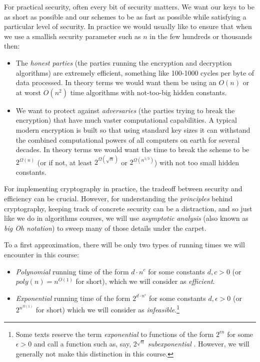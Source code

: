 For practical security, often every bit of security matters. We want our
keys to be as short as possible and our schemes to be as fast as
possible while satisfying a particular level of security. In practice we
would usually like to ensure that when we use a smallish security
parameter such as \(n\) in the few hundreds or thousands then:

\begin{itemize}
\item
  The \emph{honest parties} (the parties running the encryption and
  decryption algorithms) are extremely efficient, something like
  100-1000 cycles per byte of data processed. In theory terms we would
  want them be using an \(O(n)\) or at worst \(O(n^2)\) time algorithms
  with not-too-big hidden constants.
\item
  We want to protect against \emph{adversaries} (the parties trying to
  break the encryption) that have much vaster computational
  capabilities. A typical modern encryption is built so that using
  standard key sizes it can withstand the combined computational powers
  of all computers on earth for several decades. In theory terms we
  would want the time to break the scheme to be \(2^{\Omega(n)}\) (or if
  not, at least \(2^{\Omega(\sqrt{n})}\) or \(2^{\Omega(n^{1/3})}\))
  with not too small hidden constants.
\end{itemize}

For implementing cryptography in practice, the tradeoff between security
and efficiency can be crucial. However, for understanding the
\emph{principles} behind cryptography, keeping track of concrete
security can be a distraction, and so just like we do in algorithms
courses, we will use \emph{asymptotic analysis} (also known as \emph{big
Oh notation}) to sweep many of those details under the carpet.

To a first approximation, there will be only two types of running times
we will encounter in this course:

\begin{itemize}
\item
  \emph{Polynomial} running time of the form \(d\cdot n^c\) for some
  constants \(d,c>0\) (or \(poly(n)=n^{O(1)}\) for short), which we will
  consider as \emph{efficient}.
\item
  \emph{Exponential} running time of the form
  \(2^{d\cdot n^{\epsilon}}\) for some constants \(d,\epsilon >0\) (or
  \(2^{n^{\Omega(1)}}\) for short) which we will consider as
  \emph{infeasible}.\footnote{Some texts reserve the term
    \emph{exponential} to functions of the form \(2^{\epsilon n}\) for
    some \(\epsilon > 0\) and call a function such as, say,
    \(2^{\sqrt{n}}\) \emph{subexponential} . However, we will generally
    not make this distinction in this course.}
\end{itemize}

